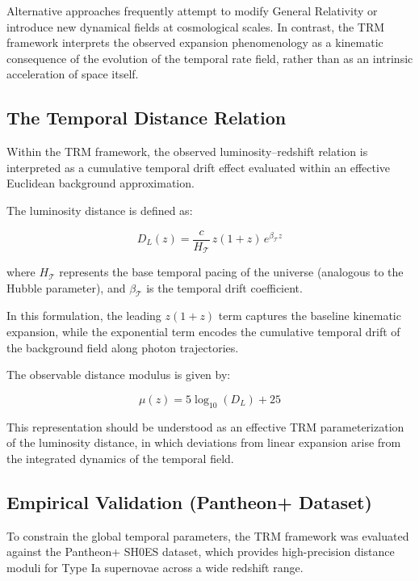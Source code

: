 \documentclass[11pt]{article}
\begin{document}
	Alternative approaches frequently attempt to modify General Relativity or introduce new dynamical fields at cosmological scales. In contrast, the TRM framework interprets the observed expansion phenomenology as a kinematic consequence of the evolution of the temporal rate field, rather than as an intrinsic acceleration of space itself.

	\subsection{The Temporal Distance Relation}

	Within the TRM framework, the observed luminosity--redshift relation is interpreted as a cumulative temporal drift effect evaluated within an effective Euclidean background approximation.

	The luminosity distance is defined as:

	\begin{equation}
		D_L(z) = \frac{c}{H_{\mathcal{T}}} \, z (1+z) \, e^{\beta_{\mathcal{T}} z}
	\end{equation}

	where $H_{\mathcal{T}}$ represents the base temporal pacing of the universe (analogous to the Hubble parameter), and $\beta_{\mathcal{T}}$ is the temporal drift coefficient.

	In this formulation, the leading $z(1+z)$ term captures the baseline kinematic expansion, while the exponential term encodes the cumulative temporal drift of the background field along photon trajectories.

	The observable distance modulus is given by:

	\begin{equation}
		\mu(z) = 5 \log_{10}(D_L) + 25
	\end{equation}

	This representation should be understood as an effective TRM parameterization of the luminosity distance, in which deviations from linear expansion arise from the integrated dynamics of the temporal field.

	\subsection{Empirical Validation (Pantheon+ Dataset)}

	To constrain the global temporal parameters, the TRM framework was evaluated against the Pantheon+ SH0ES dataset, which provides high-precision distance moduli for Type Ia supernovae across a wide redshift range.
\end{document}
